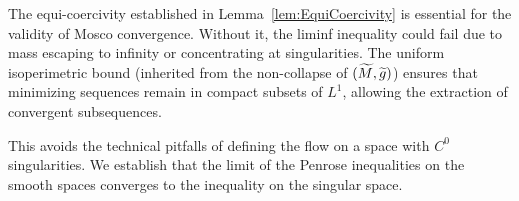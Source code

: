 \begin{remark}
The equi-coercivity established in Lemma~\ref{lem:EquiCoercivity} is essential for the validity of Mosco convergence. Without it, the liminf inequality could fail due to mass escaping to infinity or concentrating at singularities. The uniform isoperimetric bound (inherited from the non-collapse of $(\widetilde{M}, \widetilde{g})$) ensures that minimizing sequences remain in compact subsets of $L^1$, allowing the extraction of convergent subsequences.
\end{remark}

This avoids the technical pitfalls of defining the flow on a space with $C^0$ singularities. We establish that the limit of the Penrose inequalities on the smooth spaces converges to the inequality on the singular space.

